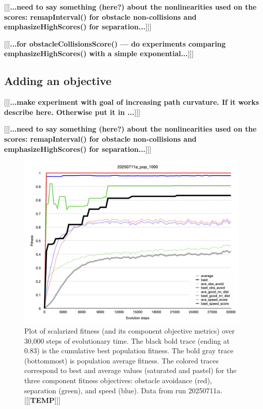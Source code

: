 \documentclass[letterpaper]{article}
\begin{document}
[[[\textbf{...need to say something (here?) about the nonlinearities used on the scores: remapInterval() for obstacle non-collisions and emphasizeHighScores() for separation...}]]]

[[[\textbf{...for obstacleCollisionsScore() --- do experiments comparing emphasizeHighScores() with a simple exponential...}]]]

\subsection{Adding an objective}
\label{subsec:add_objective}

[[[\textbf{...make experiment with goal of increasing path curvature. If it works describe here. Otherwise put it in ...}]]]

[[[\textbf{...need to say something (here?) about the nonlinearities used on the scores: remapInterval() for obstacle non-collisions and emphasizeHighScores() for separation...}]]]


\begin{figure}[t]
    \centering
    \includegraphics[width=\linewidth]{images/temp_fit_plot.png}
    \caption{Plot of scalarized fitness (and its component objective metrics) over 30,000 steps of evolutionary time. The black bold trace (ending at 0.83) is the cumulative best population fitness. The bold gray trace (bottommost) is population average fitness. The colored traces correspond to best and average values (saturated and pastel) for the three component fitness objectives: obstacle avoidance (red), separation (green), and speed (blue). Data from run 20250711a. [[[\textbf{TEMP}]]]}
    \label{fig:fit_plot}
\end{figure}
\end{document}
